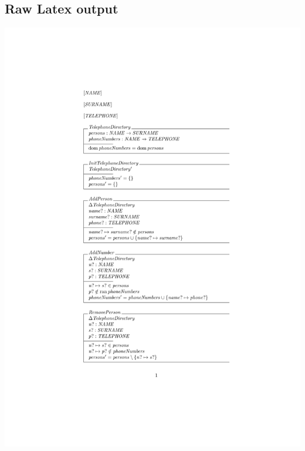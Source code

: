 \subsection{Raw Latex output}
%
\noindent \includegraphics[clip, trim=4cm 5.5cm 4cm 4.2cm, scale=0.9]{examples/nonworkzdra/0.pdf}

